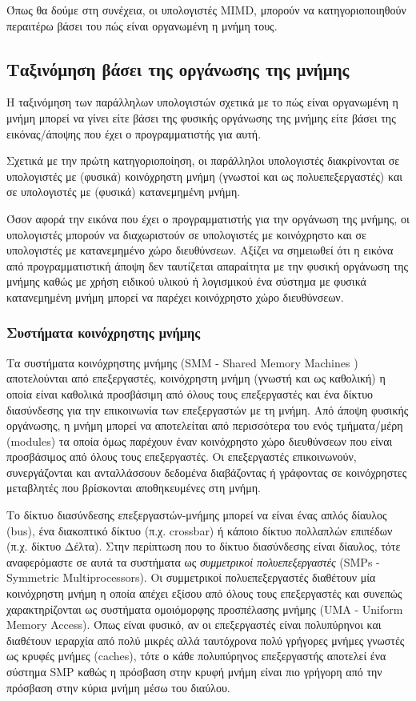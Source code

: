 Όπως θα δούμε στη συνέχεια, οι υπολογιστές MIMD, μπορούν να κατηγοριοποιηθούν περαιτέρω βάσει του πώς είναι οργανωμένη η μνήμη τους.

\subsection{Ταξινόμηση βάσει της οργάνωσης της μνήμης}
\label{ssec:Classification based on memory organization}
Η ταξινόμηση των παράλληλων υπολογιστών σχετικά με το πώς είναι οργανωμένη η μνήμη μπορεί να γίνει είτε βάσει της φυσικής οργάνωσης της μνήμης είτε βάσει της εικόνας/άποψης που έχει ο προγραμματιστής για αυτή.

Σχετικά με την πρώτη κατηγοριοποίηση, οι παράλληλοι υπολογιστές διακρίνονται σε υπολογιστές με (φυσικά) κοινόχρηστη μνήμη (γνωστοί και ως πολυεπεξεργαστές) και σε υπολογιστές με (φυσικά) κατανεμημένη μνήμη.

Όσον αφορά την εικόνα που έχει ο προγραμματιστής για την οργάνωση της μνήμης, οι υπολογιστές μπορούν να διαχωριστούν σε υπολογιστές με κοινόχρηστο και σε υπολογιστές με κατανεμημένο χώρο διευθύνσεων. Αξίζει να σημειωθεί ότι η εικόνα από προγραμματιστική άποψη δεν ταυτίζεται απαραίτητα με την φυσική οργάνωση της μνήμης καθώς με χρήση ειδικού υλικού ή λογισμικού ένα σύστημα με φυσικά κατανεμημένη μνήμη μπορεί να παρέχει κοινόχρηστο χώρο διευθύνσεων.


\subsubsection{Συστήματα κοινόχρηστης μνήμης}
Τα συστήματα κοινόχρηστης μνήμης (SMM - Shared Memory Machines \cite{rauber2010parallel}) αποτελούνται από επεξεργαστές, κοινόχρηστη μνήμη (γνωστή και ως καθολική) η οποία είναι καθολικά προσβάσιμη από όλους τους επεξεργαστές και ένα δίκτυο διασύνδεσης για την επικοινωνία των επεξεργαστών με τη μνήμη. Από άποψη φυσικής οργάνωσης, η μνήμη μπορεί να αποτελείται από περισσότερα του ενός τμήματα/μέρη (modules) τα οποία όμως παρέχουν έναν κοινόχρηστο χώρο διευθύνσεων που είναι προσβάσιμος από όλους τους επεξεργαστές. Οι επεξεργαστές επικοινωνούν, συνεργάζονται και ανταλλάσσουν δεδομένα διαβάζοντας ή γράφοντας σε κοινόχρηστες μεταβλητές που βρίσκονται αποθηκευμένες στη μνήμη.

Το δίκτυο διασύνδεσης επεξεργαστών-μνήμης μπορεί να είναι ένας απλός δίαυλος (bus), ένα διακοπτικό δίκτυο (π.χ. crossbar) ή κάποιο δίκτυο πολλαπλών επιπέδων (π.χ. δίκτυο Δέλτα). Στην περίπτωση που το δίκτυο διασύνδεσης είναι δίαυλος, τότε αναφερόμαστε σε αυτά τα συστήματα ως \textit{συμμετρικοί πολυεπεξεργαστές} (SMPs - Symmetric Multiprocessors). Οι συμμετρικοί πολυεπεξεργαστές διαθέτουν μία κοινόχρηστη μνήμη η οποία απέχει εξίσου από όλους τους επεξεργαστές και συνεπώς χαρακτηρίζονται ως συστήματα ομοιόμορφης προσπέλασης μνήμης (UMA - Uniform Memory Access). Όπως είναι φυσικό, αν οι επεξεργαστές είναι πολυπύρηνοι και διαθέτουν ιεραρχία από πολύ μικρές αλλά ταυτόχρονα πολύ γρήγορες μνήμες γνωστές ως κρυφές μνήμες (caches), τότε ο κάθε πολυπύρηνος επεξεργαστής αποτελεί ένα σύστημα SMP καθώς η πρόσβαση στην κρυφή μνήμη είναι πιο γρήγορη από την πρόσβαση στην κύρια μνήμη μέσω του διαύλου.


